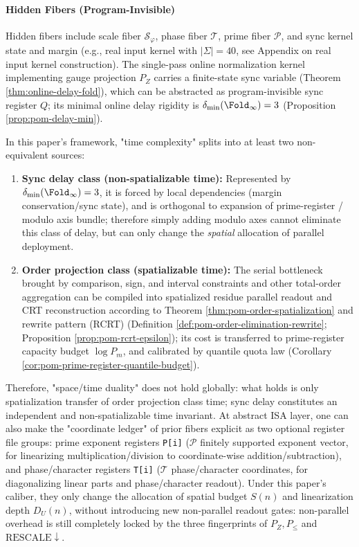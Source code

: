 \paragraph{Hidden Fibers (Program-Invisible)}
Hidden fibers include scale fiber $\mathcal{S}_\varphi$, phase fiber $\mathcal{T}$, prime fiber $\mathcal{P}$, and sync kernel state and margin (e.g., real input kernel with $|\Sigma|=40$, see Appendix on real input kernel construction).
The single-pass online normalization kernel implementing gauge projection \(P_Z\) carries a finite-state sync variable (Theorem \ref{thm:online-delay-fold}), which can be abstracted as program-invisible sync register \(Q\); its minimal online delay rigidity is \(\delta_{\min}(\Fold_\infty)=3\) (Proposition \ref{prop:pom-delay-min}).
\par
\begin{remark}\label{rem:pom-time-defect-dichotomy}
In this paper's framework, "time complexity" splits into at least two non-equivalent sources:
\begin{enumerate}
  \item \textbf{Sync delay class (non-spatializable time):} Represented by \(\delta_{\min}(\Fold_\infty)=3\), it is forced by local dependencies (margin conservation/sync state), and is orthogonal to expansion of prime-register / modulo axis bundle; therefore simply adding modulo axes cannot eliminate this class of delay, but can only change the \emph{spatial} allocation of parallel deployment.
  \item \textbf{Order projection class (spatializable time):} The serial bottleneck brought by comparison, sign, and interval constraints and other total-order aggregation can be compiled into spatialized residue parallel readout and CRT reconstruction according to Theorem \ref{thm:pom-order-spatialization} and rewrite pattern (RCRT) (Definition \ref{def:pom-order-elimination-rewrite}; Proposition \ref{prop:pom-rcrt-epsilon}); its cost is transferred to prime-register capacity budget \(\log P_m\), and calibrated by quantile quota law (Corollary \ref{cor:pom-prime-register-quantile-budget}).
\end{enumerate}
Therefore, "space/time duality" does not hold globally: what holds is only spatialization transfer of order projection class time; sync delay constitutes an independent and non-spatializable time invariant.
At abstract ISA layer, one can also make the "coordinate ledger" of prior fibers explicit as two optional register file groups: prime exponent registers \texttt{P[i]} (\(\mathcal{P}\) finitely supported exponent vector, for linearizing multiplication/division to coordinate-wise addition/subtraction), and phase/character registers \texttt{T[i]} (\(\mathcal{T}\) phase/character coordinates, for diagonalizing linear parts and phase/character readout). Under this paper's caliber, they only change the allocation of spatial budget \(S(n)\) and linearization depth \(D_U(n)\), without introducing new non-parallel readout gates: non-parallel overhead is still completely locked by the three fingerprints of \(P_Z,P_{\le}\) and \(\mathrm{RESCALE}\downarrow\).
\end{remark}

